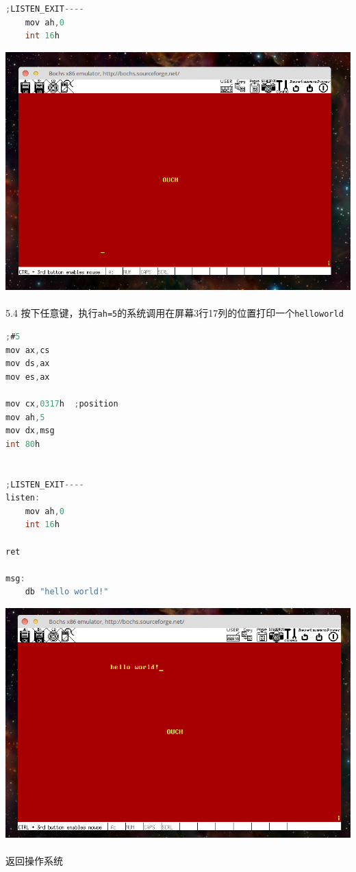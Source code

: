\documentclass[a4paper]{article}
\begin{document}
{{\begin{lstlisting}[language={C}]
;LISTEN_EXIT----
	mov ah,0
	int 16h


	\end{lstlisting}}
{\center\includegraphics[scale=0.45]{Illustrations/syscall1.png}}\\\\
5.4 按下任意键，执行\verb|ah=5|的系统调用在屏幕3行17列的位置打印一个\verb|helloworld|
{\scriptsize
\begin{lstlisting}[language={C}]
;#5
mov ax,cs
mov ds,ax
mov es,ax

mov cx,0317h  ;position
mov ah,5
mov dx,msg
int 80h


;LISTEN_EXIT----
listen:
	mov ah,0
	int 16h

ret

msg:
	db "hello world!"
	\end{lstlisting}}

{\center\includegraphics[scale=0.45]{Illustrations/syscall5.png}} \\\\
 返回操作系统\\\\

}
\end{document}
